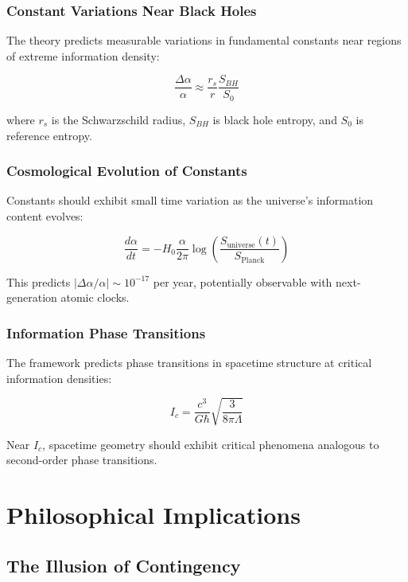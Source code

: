 \documentclass[12pt,a4paper]{article}
\begin{document}
\subsubsection{Constant Variations Near Black Holes}

The theory predicts measurable variations in fundamental constants near regions of extreme information density:

\begin{equation}
\frac{\Delta\alpha}{\alpha} \approx \frac{r_s}{r} \frac{S_{BH}}{S_0}
\end{equation}

where $r_s$ is the Schwarzschild radius, $S_{BH}$ is black hole entropy, and $S_0$ is reference entropy.

\subsubsection{Cosmological Evolution of Constants}

Constants should exhibit small time variation as the universe's information content evolves:

\begin{equation}
\frac{d\alpha}{dt} = -H_0 \frac{\alpha}{2\pi} \log\left(\frac{S_{\text{universe}}(t)}{S_{\text{Planck}}}\right)
\end{equation}

This predicts $|\Delta\alpha/\alpha| \sim 10^{-17}$ per year, potentially observable with next-generation atomic clocks.

\subsubsection{Information Phase Transitions}

The framework predicts phase transitions in spacetime structure at critical information densities:

\begin{equation}
I_c = \frac{c^3}{G\hbar} \sqrt{\frac{3}{8\pi\Lambda}}
\end{equation}

Near $I_c$, spacetime geometry should exhibit critical phenomena analogous to second-order phase transitions.

\section{Philosophical Implications}

\subsection{The Illusion of Contingency}
\end{document}

